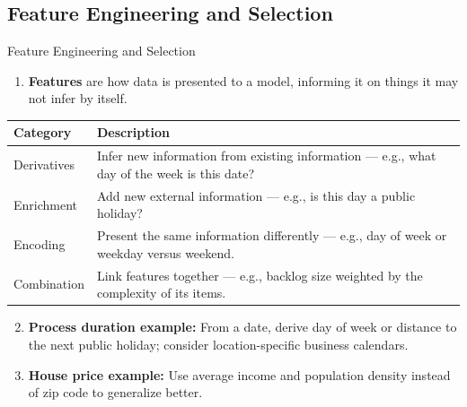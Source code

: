 \subsection{Feature Engineering and Selection}

\begin{frame}{Feature Engineering and Selection}
\begin{enumerate}
\item<1-> \textbf{Features} are how data is presented to a model, informing it on things it may not infer by itself.
\end{enumerate}
\begin{table}
\centering
\renewcommand{\arraystretch}{1.2}
\scriptsize
\begin{tabular}{|p{2.5cm}|p{10.5cm}|}
\hline
\textbf{Category} & \textbf{Description} \\ \hline
Derivatives & Infer new information from existing information --- e.g., what day of the week is this date? \\ \hline
Enrichment & Add new external information --- e.g., is this day a public holiday? \\ \hline
Encoding & Present the same information differently --- e.g., day of week or weekday versus weekend. \\ \hline
Combination & Link features together --- e.g., backlog size weighted by the complexity of its items. \\ \hline
\end{tabular}
\end{table}
\begin{enumerate}\setcounter{enumi}{1}
\item<2-> \textbf{Process duration example:} From a date, derive day of week or distance to the next public holiday; consider location-specific business calendars.
\item<3-> \textbf{House price example:} Use average income and population density instead of zip code to generalize better.
\end{enumerate}
\end{frame}

